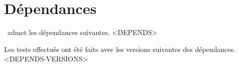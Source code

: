 \documentclass{tutodoc}
\begin{document}
\section{Dépendances}

\thisproj\ admet les dépendances suivantes.
<DEPENDS>

\begin{tdocnote}
    Les tests effectués ont été faits avec les versions suivantes des dépendances.
    <DEPENDS-VERSIONS>
\end{tdocnote}
\end{document}
